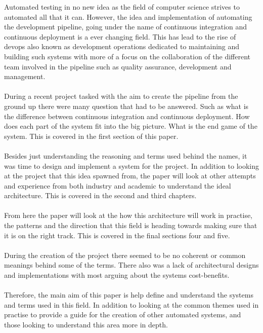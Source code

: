 Automated testing in no new idea as the field of computer science strives to automated all that it can. However, the idea and implementation of automating the development pipeline, going under the name of continuous integration and continuous deployment is a ever changing field. This has lead to the rise of devops also known as development operations dedicated to maintaining and building such systems with more of a focus on the collaboration of the different team involved in the pipeline such as quality assurance, development and management.
\\\\
During a recent project tasked with the aim to create the pipeline from the ground up there were many question that had to be answered. Such as what is the difference between continuous integration and continuous deployment. How does each part of the system fit into the big picture. What is the end game of the system. This is covered in the first section of this paper.
\\\\
Besides just understanding the reasoning and terms used behind the names, it was time to design and implement a system for the project. In addition to looking at the project that this idea spawned from, the paper will look at other attempts and experience from both industry and academic to understand the ideal architecture. This is covered in the second and third chapters.
\\\\
From here the paper will look at the how this architecture will work in practise, the patterns and the direction that this field is heading towards making sure that it is on the right track. This is covered in the final sections four and five.
\\\\
During the creation of the project there seemed to be no coherent or common meanings behind some of the terms. There also was a lack of architectural designs and implementations with most arguing about the systems cost-benefits.
\\\\
Therefore, the main aim of this paper is help define and understand the systems and terms used in this field. In addition to looking at the common themes used in practise to provide a guide for the creation of other automated systems, and those looking to understand this area more in depth.
